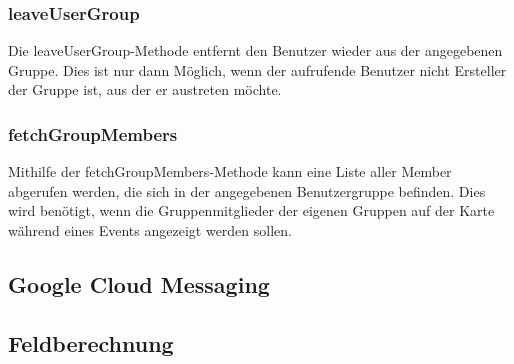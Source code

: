 \subsubsection*{leaveUserGroup}
Die leaveUserGroup-Methode entfernt den Benutzer wieder aus der angegebenen Gruppe. Dies ist nur dann Möglich, wenn der aufrufende Benutzer nicht Ersteller der Gruppe ist, aus der er austreten möchte.

\subsubsection*{fetchGroupMembers}
Mithilfe der fetchGroupMembers-Methode kann eine Liste aller Member abgerufen werden, die sich in der angegebenen Benutzergruppe befinden. Dies wird benötigt, wenn die Gruppenmitglieder der eigenen Gruppen auf der Karte während eines Events angezeigt werden sollen.


\subsection{Google Cloud Messaging}

\subsection{Feldberechnung}
\label{subsec:Feldberechnung}